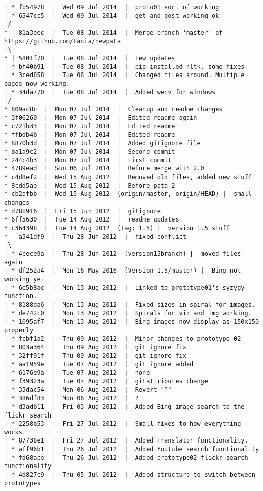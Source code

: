 \begin{verbatim}
| * fb54978  |  Wed 09 Jul 2014  |  proto01 sort of working
| * 6547cc5  |  Wed 09 Jul 2014  |  get and post working ok
|/  
*   81a3eec  |  Tue 08 Jul 2014  |  Merge branch 'master' of https://github.com/Fania/newpata
|\  
* | 5801f70  |  Tue 08 Jul 2014  |  Few updates
| * bf40b91  |  Tue 08 Jul 2014  |  pip installed nltk, some fixes
| * 3ced858  |  Tue 08 Jul 2014  |  Changed files around. Multiple pages now working.
| * 34da770  |  Tue 08 Jul 2014  |  Added wenv for windows
|/  
* 809ac8c  |  Mon 07 Jul 2014  |  Cleanup and readme changes
* 3f06260  |  Mon 07 Jul 2014  |  Edited readme again
* c721b33  |  Mon 07 Jul 2014  |  Edited readme
* ffbdb4b  |  Mon 07 Jul 2014  |  Edited readme
* 8870b3d  |  Mon 07 Jul 2014  |  Added gitignore file
* ba1a9c2  |  Mon 07 Jul 2014  |  Second commit
* 244c4b3  |  Mon 07 Jul 2014  |  First commit
* 4789ead  |  Sun 06 Jul 2014  |  Before merge with 2.0
* c4d8ef2  |  Wed 15 Aug 2012  |  Removed old files, added new stuff
* 8cdd5ae  |  Wed 15 Aug 2012  |  Before pata 2
* cb2afbb  |  Wed 15 Aug 2012  (origin/master, origin/HEAD) |  small changes
* d78b916  |  Fri 15 Jun 2012  |  gitignore
* 6ff5630  |  Tue 14 Aug 2012  |  readme updates
* c364398  |  Tue 14 Aug 2012  (tag: 1.5) |  version 1.5 stuff
*   a541df9  |  Thu 28 Jun 2012  |  fixed conflict
|\  
| * 4cece9a  |  Thu 28 Jun 2012  (version15branch) |  moved files again
| * df252a4  |  Mon 16 May 2016  (Version_1.5/master) |  Bing not working yet
| * 6e5b8ac  |  Mon 13 Aug 2012  |  Linked to prototype01's syzygy function.
| * 8188da6  |  Mon 13 Aug 2012  |  Fixed sizes in spiral for images.
| * de742c0  |  Mon 13 Aug 2012  |  Spirals for vid and img working.
| * 1095af7  |  Mon 13 Aug 2012  |  Bing images now display as 150x150 properly
| * fcbf1a2  |  Thu 09 Aug 2012  |  Minor changes to prototype 02
| * 803a364  |  Thu 09 Aug 2012  |  git ignore fix
| * 32ff91f  |  Thu 09 Aug 2012  |  git ignore fix
| * aa1959e  |  Tue 07 Aug 2012  |  git ignore added
| * 6176e9a  |  Tue 07 Aug 2012  |  none
| * f39323a  |  Tue 07 Aug 2012  |  gitattributes change
| * 35dac54  |  Mon 06 Aug 2012  |  Revert "?"
| * 386df83  |  Mon 06 Aug 2012  |  ?
| * d3adb11  |  Fri 03 Aug 2012  |  Added Bing image search to the flickr search
| * 2258b53  |  Fri 27 Jul 2012  |  Small fixes to how everything works.
| * 87738e1  |  Fri 27 Jul 2012  |  Added Translator functionality.
| * aff96b1  |  Thu 26 Jul 2012  |  Added Youtube search functionality
| * fd68ace  |  Thu 26 Jul 2012  |  Added prototype02 flickr search functionality
| * 4d827c9  |  Thu 05 Jul 2012  |  Added structure to switch between prototypes

\end{verbatim}
